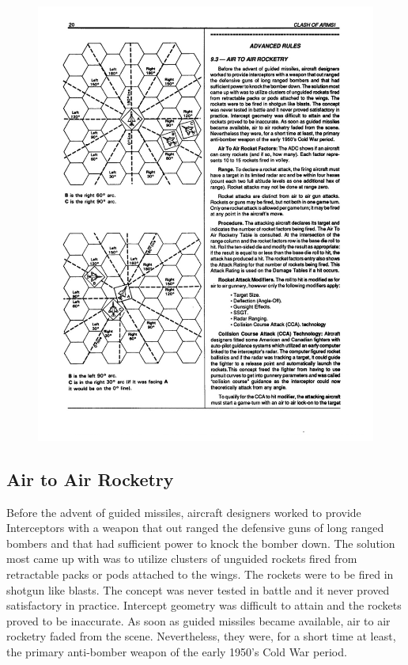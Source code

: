\begin{figure}

    \centering
    \includegraphics[width=0.9\linewidth]{figures/figure-K.pdf}
\end{figure}


\advancedrules

\subsection{Air to Air Rocketry}

Before the advent of guided missiles, aircraft designers worked to provide Interceptors with a weapon that out ranged the defensive guns of long ranged bombers and that had sufficient power to knock the bomber down. The solution most came up with was to utilize clusters of unguided rockets fired from retractable packs or pods attached to the wings. The rockets were to be fired in shotgun like blasts. The concept was never tested in battle and it never proved satisfactory in practice. Intercept geometry was difficult to attain and the rockets proved to be inaccurate. As soon as guided missiles became available, air to air rocketry faded from the scene. Nevertheless, they were, for a short time at least, the primary anti-bomber weapon of the early 1950's Cold War period.

